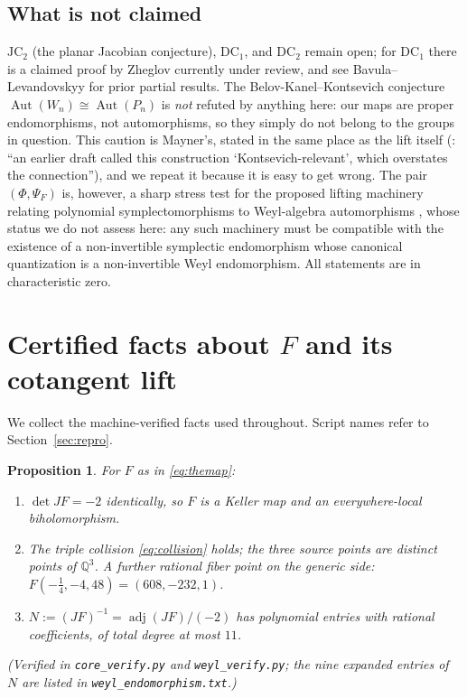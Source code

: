 \documentclass[11pt]{amsart}
\newcommand{\QQ}{\mathbb{Q}}
\newcommand{\W}{W}
\newcommand{\JC}{\mathrm{JC}}
\newcommand{\DC}{\mathrm{DC}}
\theoremstyle{plain}
\newtheorem{proposition}[theorem]{Proposition}
\theoremstyle{definition}
\theoremstyle{remark}
\begin{document}
\subsection{What is not claimed}\label{ssec:open}
$\JC_{2}$ (the planar Jacobian conjecture), $\DC_{1}$, and $\DC_{2}$
remain open; for $\DC_{1}$ there is a claimed proof by Zheglov
\cite{Zheglov24} currently under review, and see
Bavula--Levandovskyy \cite{BL20} for prior partial results. The
Belov-Kanel--Kontsevich conjecture $\operatorname{Aut}(\W_{n})\cong
\operatorname{Aut}(P_{n})$ \cite{BKK05} is \emph{not} refuted by anything
here: our maps are proper endomorphisms, not automorphisms, so they simply
do not belong to the groups in question. This caution is Mayner's, stated
in the same place as the lift itself (\cite[\S8]{Mayner26}: ``an earlier
draft called this construction `Kontsevich-relevant', which overstates the
connection''), and we repeat it because it is easy to get wrong. The pair
$(\Phi,\Psi_{F})$ is,
however, a sharp stress test for the proposed lifting machinery relating
polynomial symplectomorphisms to Weyl-algebra automorphisms
\cite{KBEY18}, whose status we do not assess here: any such
machinery must be compatible with the existence of a non-invertible
symplectic endomorphism whose canonical quantization is a non-invertible
Weyl endomorphism. All statements are in characteristic zero.

\section{Certified facts about \texorpdfstring{$F$}{F} and its cotangent
lift}\label{sec:facts}

We collect the machine-verified facts used throughout. Script names refer
to Section~\ref{sec:repro}.

\begin{proposition}\label{prop:basic}
For $F$ as in \eqref{eq:themap}:
\begin{enumerate}
\item[(i)] $\det JF=-2$ identically, so $F$ is a Keller map and an
everywhere-local biholomorphism.
\item[(ii)] The triple collision \eqref{eq:collision} holds; the three
source points are distinct points of $\QQ^{3}$. A further rational fiber
point on the generic side: $F(-\tfrac14,-4,48)=(608,-232,1)$.
\item[(iii)] $N:=(JF)^{-1}=\operatorname{adj}(JF)/(-2)$ has polynomial
entries with rational coefficients, of total degree at most $11$.
\end{enumerate}
\emph{(Verified in \texttt{core\_verify.py} and \texttt{weyl\_verify.py};
the nine expanded entries of $N$ are listed in
\texttt{weyl\_endomorphism.txt}.)}
\end{proposition}
\end{document}
